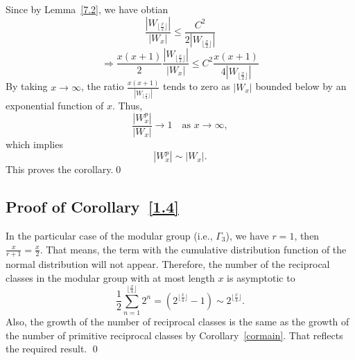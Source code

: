 \documentclass[11pt]{amsart}
\renewenvironment{proof}{{\bfseries Proof.}}{\qed}
\numberwithin{equation}{section}
\newtheorem{lemma}[theorem]{Lemma}
\newcommand{\imp}{\Rightarrow}
\newcommand{\lemref}[1]{Lemma~\ref{#1}}
\newcommand{\corref}[1]{Corollary~\ref{#1}}
\numberwithin{equation}{section}
\begin{document}
	         Since by \lemref{7.2}, we have obtian
	         \[
	         \frac{\left|W_{\lfloor\frac{x}{2}\rfloor}\right|}{\left|W_{x}\right|}\leq \frac{C^2}{2|W_{\lfloor\frac{x}{2}\rfloor}|}
	         \]
	         \[\imp  \frac{x(x+1)}{2}\frac{\left|W_{\lfloor\frac{x}{2}\rfloor}\right|}{\left|W_{x}\right|}\leq C^2\frac{x(x+1)}{4|W_{\lfloor\frac{x}{2}\rfloor}|} \]
	         By taking  \( x \to \infty \), the ratio $\frac{x(x+1)}{|W_{\lfloor\frac{x}{2}\rfloor}|}$ tends to zero as $|W_{x}|$ bounded below by an exponential function of $x$. Thus,
	          \[
	          \frac{|W^{p}_{x}|}{|W_{x}|}\to 1 \quad \text{as } x \to \infty,
	          \]
	          which implies
	          \[
	        {|W^{p}_{x}|}\sim{|W_{x}|}.
	          \]
	          This proves the corollary.\qed 
	          
		 		
		\subsection{Proof of \corref{1.4}}
			In the particular case of the modular group (i.e., $\Gamma_3$), we have $r=1$, then $\frac{x}{r+1}=\frac{x}{2}.$ That means, the term with the cumulative distribution function
			 of the normal distribution will not appear. Therefore, the number of the reciprocal classes in the modular group with at most length $x$ is asymptotic to
			\[\frac{1}{2}\sum_{n=1}^{\lfloor \frac{x}{4}\rfloor}2^{n}=(2^{\lfloor \frac{x}{4}\rfloor}-1)\sim 2^{\lfloor \frac{x}{4}\rfloor}.  \] Also, the growth of the number of reciprocal classes is the same as the growth of the number of primitive reciprocal classes by \corref{cormain}. That reflects the required result. \qed
		
		
	
\end{document}
